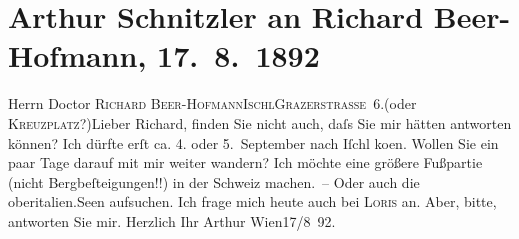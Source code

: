 

         
         \renewcommand{\erwaehntePersonen}{Personen: Richard Beer-Hofmann, Hugo von Hofmannsthal}
         \renewcommand{\erwaehnteOrte}{Orte: Bad Ischl, Grazer Straße, Italien, Kreuzplatz, Schweiz, Wien}
         \renewcommand{\erwaehnteWerke}{}
               \section[Arthur Schnitzler an Richard Beer-Hofmann, 17. 8. 1892]{ Arthur Schnitzler an Richard Beer-Hofmann, 17. 8. 1892}\nopagebreak{}\rehead{ }\begin{ledgroupsized}[t]{13cm}\normalsize\beginnumbering{} \toendnotes[C]{\smallbreak\pagebreak[2]} 
\pstart{}{\pb}Herrn Doctor \textsc{Richard
                     Beer-Hofmann}\pend{}\pstart{}\textsc{Ischl}\pend{}\pstart{}\textsc{Grazerstraße 6}.\pend{}\pstart{}(oder \textsc{Kreuzplatz}?)\pend{}{\bigskip}\pstart{}{\pb}Lieber Richard,\pend\pstart
           finden Sie nicht auch, daſs Sie mir hätten antworten können? Ich dürfte erſt ca.
                  4. oder 5. September nach Iſchl ko{\geminationm}en.
               Wollen Sie ein paar Tage darauf mit mir weiter wandern? Ich möchte eine größere
               Fußpartie (nicht Bergbeſteigungen!!) {\pb}in der Schweiz machen. – Oder auch die oberitalien.Seen aufsuchen. Ich frage mich heute auch bei \textsc{Loris} an. Aber, bitte, antworten Sie mir.\pend
           \pstart Herzlich Ihr \spacefill\mbox{Arthur}\pend{}\pstart
           Wien17/8 92.\pend
           
         
         \endnumbering{}\end{ledgroupsized}  \newcommand{\dateiname}{L00114}\newcommand{\titel}{Arthur Schnitzler an Richard Beer-Hofmann, 17. 8. 1892}\newcommand{\editorInnen}{Martin Anton Müller und Gerd-Hermann Susen}
      